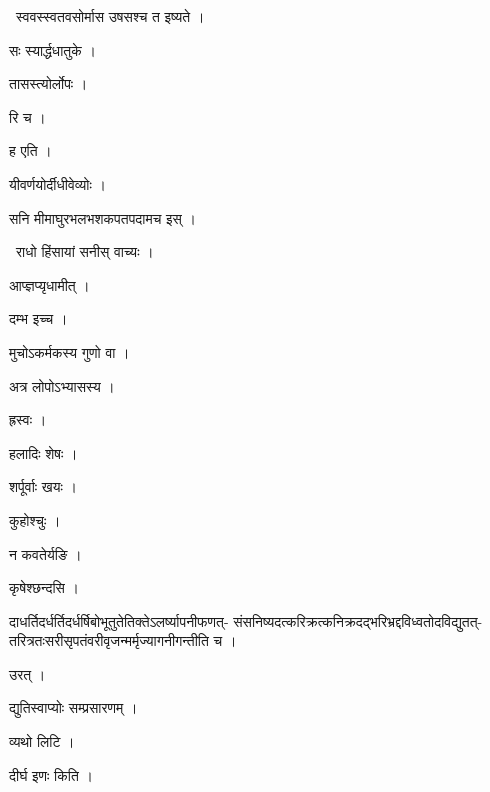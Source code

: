 \documentclass[10pt, openany, oneside]{book}
\begin{document}
\par\noindent\hspace{1.5em}{\vps वा॰}~{\qt स्ववस्स्वतवसोर्मास उषसश्च त इष्यते ।}

\noindent सः स्यार्द्धधातुके ।

\noindent तासस्त्योर्लोपः ।

\noindent रि च ।

\noindent ह एति ।

\noindent यीवर्णयोर्दीधीवेव्योः ।

\noindent सनि मीमाघुरभलभशकपतपदामच इस् ।

\par\noindent\hspace{1.5em}{\vps वा॰}~{\qt राधो हिंसायां सनीस् वाच्यः ।}

\noindent आप्ज्ञप्यृधामीत् ।

\noindent दम्भ इच्च ।

\noindent मुचोऽकर्मकस्य गुणो वा ।

\noindent अत्र लोपोऽभ्यासस्य ।

\noindent ह्रस्वः ।

\noindent हलादिः शेषः ।

\noindent शर्पूर्वाः खयः ।

\noindent कुहोश्चुः ।

\noindent न कवतेर्यङि ।

\noindent कृषेश्छन्दसि ।

\noindent दाधर्तिदर्धर्तिदर्धर्षिबोभूतुतेतिक्तेऽलर्ष्यापनीफणत्- संसनिष्यदत्करिक्रत्कनिक्रदद्भरिभ्रद्दविध्वतोदविद्युतत्- तरित्रतःसरीसृपतंवरीवृजन्मर्मृज्यागनीगन्तीति च ।

\noindent उरत् ।

\noindent द्युतिस्वाप्योः सम्प्रसारणम् ।

\noindent व्यथो लिटि ।

\noindent दीर्घ इणः किति ।
\end{document}
